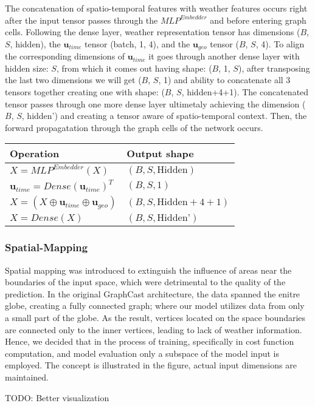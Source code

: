 \noindent The concatenation of spatio-temporal features with weather features occurs right after the input tensor passes through the $MLP^{Embedder}$ and before entering graph cells. Following the dense layer, weather representation tensor has dimensions ($B$, $S$, hidden), the $\mathbf{u}_{time}$ tensor (batch, 1, 4), and the $\mathbf{u}_{geo}$ tensor ($B$, $S$, 4). To align the corresponding dimensions of $\mathbf{u}_{time}$ it goes through another dense layer with hidden size: $S$, from which it comes out having shape: ($B$, 1, $S$), after transposing the last two dimensions we will get ($B$, $S$, 1) and ability to concatenate all 3 tensors together creating one with shape: ($B$, $S$, hidden+4+1). The concatenated tensor passes through one more dense layer ultimetaly achieving the dimension ($B$, $S$, hidden') and creating a tensor aware of spatio-temporal context. Then, the forward propagatation through the graph cells of the network occurs.

\begin{center}
    \begin{tabular}{|l|l|}
        \hline
        \textbf{Operation} & \textbf{Output shape} \\
        \hline
        $X = MLP^{Embedder}(X)$ & $(B, S, \text{Hidden})$ \\
        $\mathbf{u}_{time} = Dense(\mathbf{u}_{time})^T$ & $(B, S, 1)$ \\
        $X = (X \oplus \mathbf{u}_{time} \oplus \mathbf{u}_{geo})$ & $(B, S, \text{Hidden} + 4 + 1)$ \\
        $X = Dense(X)$ & $(B, S, \text{Hidden'})$ \\
        \hline
    \end{tabular}
\end{center}

\subsubsection{Spatial-Mapping}
Spatial mapping was introduced to extinguish the influence of areas near the boundaries of the input space, which were detrimental to the quality of the prediction. In the original GraphCast architecture, the data spanned the enitre globe, creating a fully connected graph; where our model utilizes data from only a small part of the globe. As the result, vertices located on the space boundaries are connected only to the inner vertices, leading to lack of weather information. Hence, we decided that in the process of training, specifically in cost function computation, and model evaluation only a subspace of the model input is employed. The concept is illustrated in the figure, actual input dimensions are maintained.


 

\noindent TODO: Better visualization